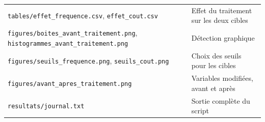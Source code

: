 \documentclass[

  french,

  10pt,

  a4paper,

]{article}
\begin{document}
{\begin{longtable}[]{@{}

  >{\raggedright\arraybackslash}p{}

  >{\raggedright\arraybackslash}p{}@{}}
\texttt{tables/effet\_frequence.csv}, \texttt{effet\_cout.csv} & Effet du traitement sur les deux cibles \\

\texttt{figures/boites\_avant\_traitement.png}, \texttt{histogrammes\_avant\_traitement.png} & Détection graphique \\

\texttt{figures/seuils\_frequence.png}, \texttt{seuils\_cout.png} & Choix des seuils pour les cibles \\

\texttt{figures/avant\_apres\_traitement.png} & Variables modifiées, avant et après \\

\texttt{resultats/journal.txt} & Sortie complète du script \\

\end{longtable}

}
\end{document}
